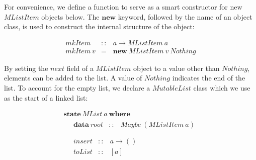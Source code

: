 \documentclass[runningheads,a4paper]{llncs}
\begin{document}
For convenience, we define a function to serve as a smart constructor for new $\mathit{MListItem}$ objects below. The $\mathbf{new}$ keyword, followed by the name of an object class, is used to construct the internal structure of the object:

\begin{displaymath}
\begin{array}{lcl}
\mathit{mkItem} & :: & a \to \mathit{MListItem}~a \\
\mathit{mkItem}~v & = & \mathbf{new}~\mathit{MListItem}~v~\mathit{Nothing}
\end{array}
\end{displaymath}

By setting the $\mathit{next}$ field of a $\mathit{MListItem}$ object to a value other than $\mathit{Nothing}$, elements can be added to the list. A value of $\mathit{Nothing}$ indicates the end of the list. To account for the empty list, we declare a $\mathit{MutableList}$ class which we use as the start of a linked list:

\begin{displaymath}
\begin{array}{l}
\mathbf{state}~\mathit{MList}~a~\mathbf{where} \\
\quad \begin{array}{lcl}
\mathbf{data}~\mathit{root}  & :: & \mathit{Maybe}~(\mathit{MListItem}~a)
\end{array}\\\\
\quad \begin{array}{lcl}
\mathit{insert} & :: & a \to () \\
\mathit{toList} & :: & [a]
\end{array}
\end{array}
\end{displaymath}
\end{document}
